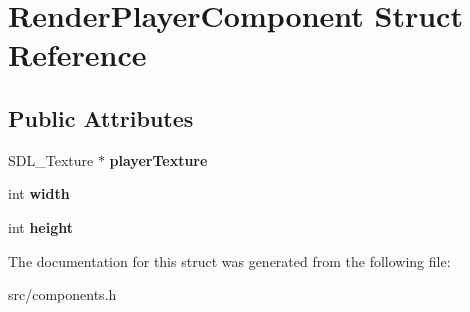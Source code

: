 \section{\-Render\-Player\-Component \-Struct \-Reference}
\label{struct_render_player_component}
\subsection*{\-Public \-Attributes}
\begin{DoxyCompactItemize}
\item 
\-S\-D\-L\-\_\-\-Texture $\ast$ {\bfseries player\-Texture}\label{struct_render_player_component_a1bff30f206bfa02104725e5c939f8c98}

\item 
int {\bfseries width}\label{struct_render_player_component_a82d83ba67e98b161cff83ad5abae3c3b}

\item 
int {\bfseries height}\label{struct_render_player_component_a2c02010f1462a6afed5cd815f70b93d8}

\end{DoxyCompactItemize}


\-The documentation for this struct was generated from the following file\-:\begin{DoxyCompactItemize}
\item 
src/components.\-h\end{DoxyCompactItemize}
